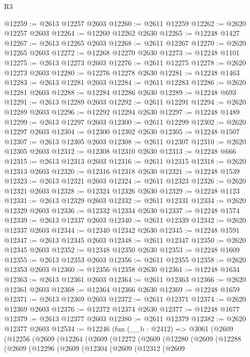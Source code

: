 \begin{lexlean}{R3}
\begin{coremodule}
@12259 := @2613 @12257 @2603
@12260 := @2611 @12259
@12262 := @2620 @12257 @2603
@12264 := @12260 @12262 @2630
@12265 := @12248 @1427
@12267 := @2613 @12265 @2603
@12268 := @2611 @12267
@12270 := @2620 @12265 @2603
@12272 := @12268 @12270 @2630
@12273 := @12248 @1101
@12275 := @2613 @12273 @2603
@12276 := @2611 @12275
@12278 := @2620 @12273 @2603
@12280 := @12276 @12278 @2630
@12281 := @12248 @1463
@12283 := @2613 @12281 @2603
@12284 := @2611 @12283
@12286 := @2620 @12281 @2603
@12288 := @12284 @12286 @2630
@12289 := @12248 @693
@12291 := @2613 @12289 @2603
@12292 := @2611 @12291
@12294 := @2620 @12289 @2603
@12296 := @12292 @12294 @2630
@12297 := @12248 @1489
@12299 := @2613 @12297 @2603
@12300 := @2611 @12299
@12302 := @2620 @12297 @2603
@12304 := @12300 @12302 @2630
@12305 := @12248 @1507
@12307 := @2613 @12305 @2603
@12308 := @2611 @12307
@12310 := @2620 @12305 @2603
@12312 := @12308 @12310 @2630
@12313 := @12248 @666
@12315 := @2613 @12313 @2603
@12316 := @2611 @12315
@12318 := @2620 @12313 @2603
@12320 := @12316 @12318 @2630
@12321 := @12248 @1539
@12323 := @2613 @12321 @2603
@12324 := @2611 @12323
@12326 := @2620 @12321 @2603
@12328 := @12324 @12326 @2630
@12329 := @12248 @1123
@12331 := @2613 @12329 @2603
@12332 := @2611 @12331
@12334 := @2620 @12329 @2603
@12336 := @12332 @12334 @2630
@12337 := @12248 @1574
@12339 := @2613 @12337 @2603
@12340 := @2611 @12339
@12342 := @2620 @12337 @2603
@12344 := @12340 @12342 @2630
@12345 := @12248 @1591
@12347 := @2613 @12345 @2603
@12348 := @2611 @12347
@12350 := @2620 @12345 @2603
@12352 := @12348 @12350 @2630
@12353 := @12248 @1609
@12355 := @2613 @12353 @2603
@12356 := @2611 @12355
@12358 := @2620 @12353 @2603
@12360 := @12356 @12358 @2630
@12361 := @12248 @1634
@12363 := @2613 @12361 @2603
@12364 := @2611 @12363
@12366 := @2620 @12361 @2603
@12368 := @12364 @12366 @2630
@12369 := @12248 @1659
@12371 := @2613 @12369 @2603
@12372 := @2611 @12371
@12374 := @2620 @12369 @2603
@12376 := @12372 @12374 @2630
@12377 := @12248 @1677
@12379 := @2613 @12377 @2603
@12380 := @2611 @12379
@12382 := @2620 @12377 @2603
@12534 := @12246
    (fun (__b : @2412) =>
    @3061
      (@2609
        (@12256
          (@2609
            (@12264
              (@2609
                (@12272
                  (@2609
                    (@12280
                      (@2609
                        (@12288
                          (@2609
                            (@12296
                              (@2609
                                (@12304
                                  (@2609
                                    (@12312
                                      (@2609

\end{coremodule}
\end{lexlean}
